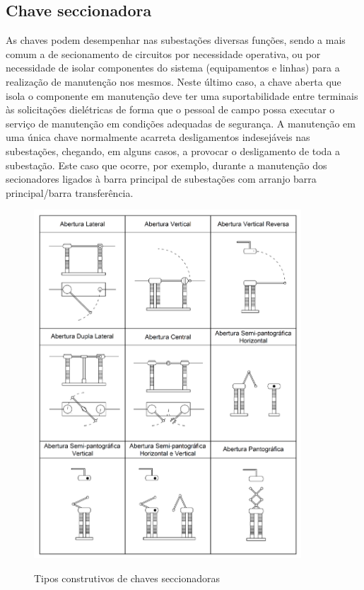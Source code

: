 \documentclass[a5paper,english,spanish,brazil]{ufsc-thesis}
\begin{document}
\subsection{Chave seccionadora}
As chaves podem desempenhar nas subestações diversas funções, sendo a mais comum a de secionamento de circuitos por necessidade operativa, ou por necessidade de isolar componentes do sistema (equipamentos e linhas) para a realização de manutenção nos mesmos. Neste último caso, a chave aberta que isola o componente em manutenção deve ter uma suportabilidade entre terminais às solicitações dielétricas de forma que o pessoal de campo possa executar o serviço de manutenção em condições adequadas de segurança. A manutenção em uma única chave normalmente acarreta desligamentos indesejáveis nas subestações, chegando, em alguns casos, a provocar o desligamento de toda a subestação. Este caso que ocorre, por exemplo, durante a manutenção dos secionadores ligados à barra principal de subestações com arranjo barra principal/barra transferência.

\begin{figure}[htb]
  \caption{Tipos construtivos de chaves seccionadoras}
  \centering
  \includegraphics[width=10cm]{chavesec.pdf}
  \label{fig:chavesec}
\end{figure}
\end{document}
